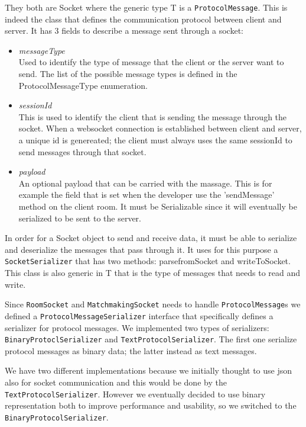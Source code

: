 They both are Socket where the generic type T is a \texttt{ProtocolMessage}. This is indeed the class that defines the communication protocol between client and server. It has 3 fields to describe a message sent through a socket:
\begin{itemize}
	\item \textit{messageType} \\
	Used to identify the type of message that the client or the server want to send. The list of the possible message types is defined in the ProtocolMessageType enumeration.
	\item \textit{sessionId} \\
	This is used to identify the client that is sending the message through the socket. When a websocket connection is established between client and server, a unique id is genereated; the client must always uses the same sessionId to send messages through that socket.
	\item \textit{payload} \\ 
	An optional payload that can be carried with the massage. This is for example the field that is set when the developer use the 'sendMessage' method on the client room. It must be Serializable since it will eventually be serialized to be sent to the server.
\end{itemize}

In order for a Socket object to send and receive data, it must be able to serialize and deserialize the messages that pass through it. It uses for this purpose a \texttt{SocketSerializer} that has two methods: parsefromSocket and writeToSocket. This class is also generic in T that is the type of messages that needs to read and write.

Since \texttt{RoomSocket} and \texttt{MatchmakingSocket} needs to handle \texttt{ProtocolMessage}s we defined a \texttt{ProtocolMessageSerializer} interface that specifically defines a serializer for protocol messages. We implemented two types of serializers: \texttt{BinaryProtoclSerializer} and \texttt{TextProtocolSerializer}. The first one serialize protocol messages as binary data; the latter instead as text messages.
 
We have two different implementations because we initially thought to use json also for socket communication and this would be done by the \texttt{TextProtocolSerializer}. However we eventually decided to use binary representation both to improve performance and usability, so we switched to the \texttt{BinaryProtocolSerializer}.


